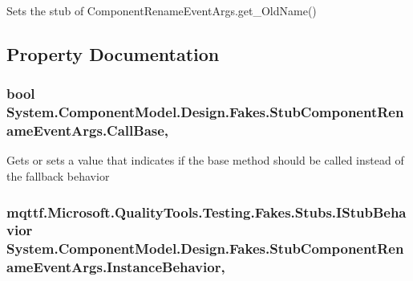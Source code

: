 Sets the stub of Component\-Rename\-Event\-Args.\-get\-\_\-\-Old\-Name()



\subsection{Property Documentation}
\hypertarget{class_system_1_1_component_model_1_1_design_1_1_fakes_1_1_stub_component_rename_event_args_adf6f2c6d6224ec229bae8db0d46f9584}{
\subsubsection[{Call\-Base}]{\setlength{\rightskip}{0pt plus 5cm}bool System.\-Component\-Model.\-Design.\-Fakes.\-Stub\-Component\-Rename\-Event\-Args.\-Call\-Base\hspace{0.3cm}{\ttfamily [get]}, {\ttfamily [set]}}}\label{class_system_1_1_component_model_1_1_design_1_1_fakes_1_1_stub_component_rename_event_args_adf6f2c6d6224ec229bae8db0d46f9584}


Gets or sets a value that indicates if the base method should be called instead of the fallback behavior

\hypertarget{class_system_1_1_component_model_1_1_design_1_1_fakes_1_1_stub_component_rename_event_args_a4c9863ed4a6ec2b215d44b9791b1c591}{
\subsubsection[{Instance\-Behavior}]{\setlength{\rightskip}{0pt plus 5cm}mqttf.\-Microsoft.\-Quality\-Tools.\-Testing.\-Fakes.\-Stubs.\-I\-Stub\-Behavior System.\-Component\-Model.\-Design.\-Fakes.\-Stub\-Component\-Rename\-Event\-Args.\-Instance\-Behavior\hspace{0.3cm}{\ttfamily [get]}, {\ttfamily [set]}}}\label{class_system_1_1_component_model_1_1_design_1_1_fakes_1_1_stub_component_rename_event_args_a4c9863ed4a6ec2b215d44b9791b1c591}


